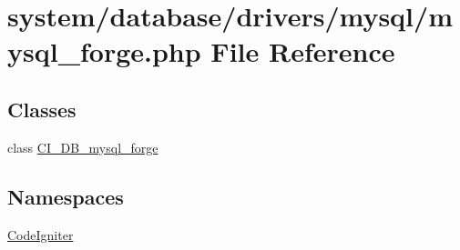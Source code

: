 \hypertarget{mysql__forge_8php}{}\section{system/database/drivers/mysql/mysql\+\_\+forge.php File Reference}
\label{mysql__forge_8php}
\subsection*{Classes}
\begin{DoxyCompactItemize}
\item 
class \mbox{\hyperlink{class_c_i___d_b__mysql__forge}{C\+I\+\_\+\+D\+B\+\_\+mysql\+\_\+forge}}
\end{DoxyCompactItemize}
\subsection*{Namespaces}
\begin{DoxyCompactItemize}
\item 
 \mbox{\hyperlink{namespace_code_igniter}{Code\+Igniter}}
\end{DoxyCompactItemize}
